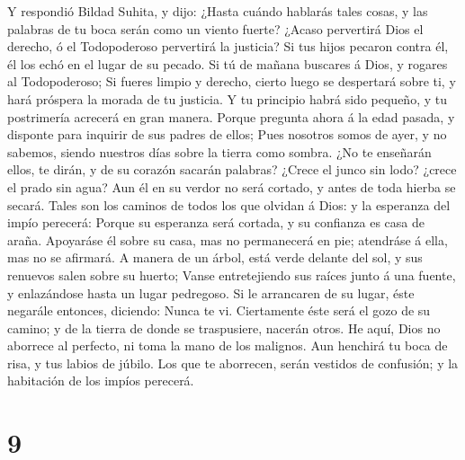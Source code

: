  Y respondió Bildad Suhita, y dijo:  ¿Hasta
cuándo hablarás tales cosas, y las palabras de tu boca serán como un
viento fuerte?  ¿Acaso pervertirá Dios el derecho, ó el
Todopoderoso pervertirá la justicia?  Si tus hijos pecaron
contra él, él los echó en el lugar de su pecado.  Si tú de
mañana buscares á Dios, y rogares al Todopoderoso;  Si
fueres limpio y derecho, cierto luego se despertará sobre ti, y hará
próspera la morada de tu justicia.  Y tu principio habrá
sido pequeño, y tu postrimería acrecerá en gran manera. 
Porque pregunta ahora á la edad pasada, y disponte para inquirir de sus
padres de ellos;  Pues nosotros somos de ayer, y no
sabemos, siendo nuestros días sobre la tierra como sombra.
 ¿No te enseñarán ellos, te dirán, y de su corazón
sacarán palabras?  ¿Crece el junco sin lodo? ¿crece el
prado sin agua?  Aun él en su verdor no será cortado, y
antes de toda hierba se secará.  Tales son los caminos de
todos los que olvidan á Dios: y la esperanza del impío perecerá:
 Porque su esperanza será cortada, y su confianza es casa
de araña.  Apoyaráse él sobre su casa, mas no permanecerá
en pie; atendráse á ella, mas no se afirmará.  A manera
de un árbol, está verde delante del sol, y sus renuevos salen sobre su
huerto;  Vanse entretejiendo sus raíces junto á una
fuente, y enlazándose hasta un lugar pedregoso.  Si le
arrancaren de su lugar, éste negarále entonces, diciendo: Nunca te vi.
 Ciertamente éste será el gozo de su camino; y de la
tierra de donde se traspusiere, nacerán otros.  He aquí,
Dios no aborrece al perfecto, ni toma la mano de los malignos.
 Aun henchirá tu boca de risa, y tus labios de júbilo.
 Los que te aborrecen, serán vestidos de confusión; y la
habitación de los impíos perecerá.

\hypertarget{section-8}{%
\section{9}\label{section-8}}

